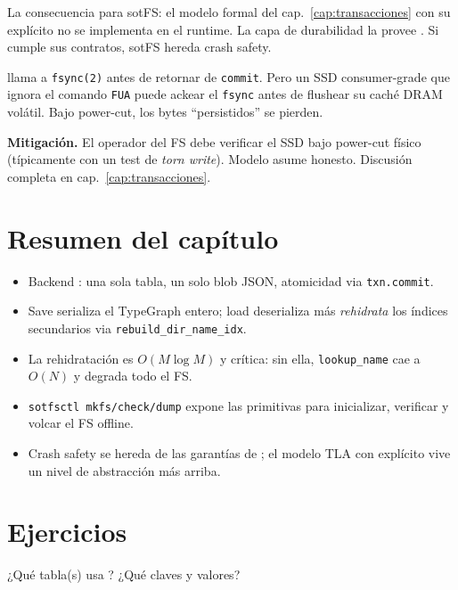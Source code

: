 La consecuencia para sotFS: el modelo formal del cap.~\ref{cap:transacciones}
con su \wal{} explícito no se implementa en el runtime. La capa de
durabilidad la provee \redb. Si \redb{} cumple sus contratos, sotFS
hereda crash safety.

\begin{trampa}
\label{tr:fsync-ssd}
\redb{} llama a \texttt{fsync(2)} antes de retornar de \texttt{commit}.
Pero un SSD consumer-grade que ignora el comando \texttt{FUA} puede
ackear el \texttt{fsync} antes de flushear su caché DRAM volátil. Bajo
power-cut, los bytes ``persistidos'' se pierden.

\textbf{Mitigación.} El operador del FS debe verificar el SSD bajo
power-cut físico (típicamente con un test de \emph{torn write}). Modelo
asume \fsync{} honesto. Discusión completa en cap.~\ref{cap:transacciones}.
\end{trampa}

\section*{Resumen del capítulo}

\begin{itemize}
  \item Backend \redb: una sola tabla, un solo blob JSON, atomicidad
    via \texttt{txn.commit}.
  \item Save serializa el TypeGraph entero; load deserializa más
    \emph{rehidrata} los índices secundarios via
    \texttt{rebuild\_dir\_name\_idx}.
  \item La rehidratación es \(O(M \log M)\) y crítica: sin ella,
    \texttt{lookup\_name} cae a $O(N)$ y degrada todo el FS.
  \item \texttt{sotfsctl mkfs/check/dump} expone las primitivas para
    inicializar, verificar y volcar el FS offline.
  \item Crash safety se hereda de las garantías de \redb; el modelo TLA
    con \wal{} explícito vive un nivel de abstracción más arriba.
\end{itemize}

\section*{Ejercicios}

\begin{ejercicio}[\dificultad{$\star$}]
\label{ej:pers-1}
¿Qué tabla(s) usa ? ¿Qué claves y valores?
\end{ejercicio}

